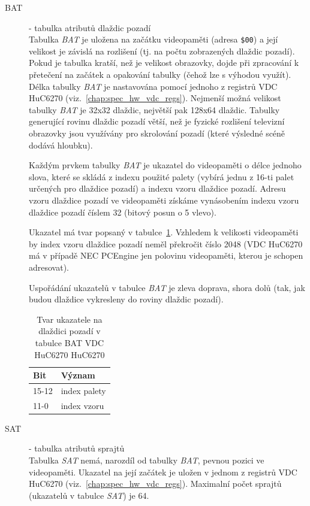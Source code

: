\begin{description}
\item[BAT] - tabulka atributů dlaždic pozadí\\
	Tabulka {\it BAT} je uložena na začátku videopaměti (adresa {\tt \$00}) a
	její velikost je závislá na rozlišení (tj. na počtu zobrazených dlaždic
	pozadí). Pokud je tabulka kratší, než je velikost obrazovky, dojde při
	zpracování k přetečení na začátek a opakování tabulky (čehož lze s výhodou
	využít). Délka tabulky {\it BAT} je nastavována pomocí jednoho z registrů
	VDC HuC6270 (viz.~\ref{chap:spec_hw_vdc_regs}). Nejmenší možná velikost
	tabulky {\it BAT} je 32x32 dlaždic, největší pak 128x64 dlaždic. Tabulky
	generující rovinu dlaždic pozadí větší, než je fyzické rozlišení televizní
	obrazovky jsou využívány pro skrolování pozadí (které výsledné scéně dodává
	hloubku).

	Každým prvkem tabulky {\it BAT} je ukazatel do videopaměti o délce jednoho
	slova, které se skládá z indexu použité palety (vybírá jednu z 16-ti palet
	určených pro dlaždice pozadí) a indexu vzoru dlaždice pozadí. Adresu vzoru
	dlaždice pozadí ve videopaměti získáme vynásobením indexu vzoru dlaždice
	pozadí číslem 32 (bitový posun o 5 vlevo).

	Ukazatel má tvar popsaný v tabulce~\ref{tab:vdc_batword}. Vzhledem k
	velikosti videopaměti by index vzoru dlaždice pozadí neměl překročit číslo
	2048 (VDC HuC6270 má v případě NEC PCEngine jen polovinu videopaměti,
	kterou je schopen adresovat).~\cite{Schleussinger98}

	Uspořádání ukazatelů v tabulce {\it BAT} je zleva doprava, shora dolů (tak,
	jak budou dlaždice vykresleny do roviny dlaždic pozadí).

	\begin{table}[ht]
	\begin{center}
	\begin{tabular}{|l|l|}
	\hline
	\textbf{Bit} & \textbf{Význam} \\
	\hline
	15-12 & index palety \\
	11-0 & index vzoru \\
	\hline
	\end{tabular}
	\end{center}
	\caption{Tvar ukazatele na dlaždici pozadí v tabulce BAT VDC HuC6270
		HuC6270\label{tab:vdc_batword}}
	\end{table}

\item[SAT] - tabulka atributů sprajtů\\
	Tabulka {\it SAT} nemá, narozdíl od tabulky {\it BAT}, pevnou pozici ve
	videopaměti. Ukazatel na její začátek je uložen v jednom z registrů VDC
	HuC6270 (viz.~\ref{chap:spec_hw_vdc_regs}). Maximalní počet sprajtů
	(ukazatelů v tabulce {\it SAT}) je 64.


\end{description}

